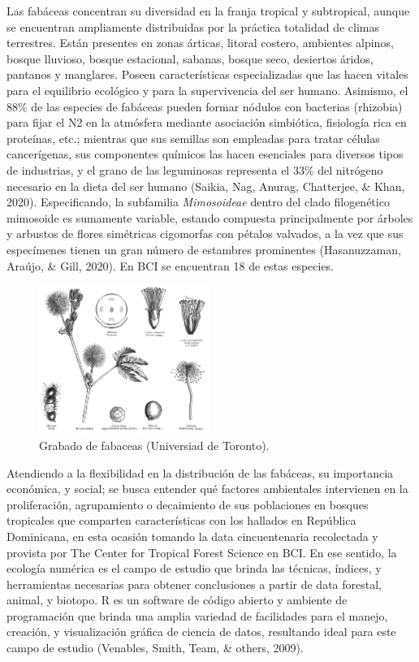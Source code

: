 \documentclass[11pt,]{article}
\begin{document}
Las fabáceas concentran su diversidad en la franja tropical y
subtropical, aunque se encuentran ampliamente distribuidas por la
práctica totalidad de climas terrestres. Están presentes en zonas
árticas, litoral costero, ambientes alpinos, bosque lluvioso, bosque
estacional, sabanas, bosque seco, desiertos áridos, pantanos y
manglares. Poseen características especializadas que las hacen vitales
para el equilibrio ecológico y para la supervivencia del ser humano.
Asimismo, el 88\% de las especies de fabáceas pueden formar nódulos con
bacterias (rhizobia) para fijar el N2 en la atmósfera mediante
asociación simbiótica, fisiología rica en proteínas, etc.; mientras que
sus semillas son empleadas para tratar células cancerígenas, sus
componentes químicos las hacen esenciales para diversos tipos de
industrias, y el grano de las leguminosas representa el 33\% del
nitrógeno necesario en la dieta del ser humano (Saikia, Nag, Anurag,
Chatterjee, \& Khan, 2020). Especificando, la subfamilia
\emph{Mimosoideae} dentro del clado filogenético mimosoide es sumamente
variable, estando compuesta principalmente por árboles y arbustos de
flores simétricas cigomorfas con pétalos valvados, a la vez que sus
especímenes tienen un gran número de estambres prominentes
(Hasanuzzaman, Araújo, \& Gill, 2020). En BCI se encuentran 18 de estas
especies.

\begin{figure}
\centering
\includegraphics[width=0.50000\textwidth]{Grabado-Mimosoideae.png}
\caption{Grabado de fabaceas (Universiad de Toronto). \label{fig:grab}}
\end{figure}

Atendiendo a la flexibilidad en la distribución de las fabáceas, su
importancia económica, y social; se busca entender qué factores
ambientales intervienen en la proliferación, agrupamiento o decaimiento
de sus poblaciones en bosques tropicales que comparten características
con los hallados en República Dominicana, en esta ocasión tomando la
data cincuentenaria recolectada y provista por The Center for Tropical
Forest Science en BCI. En ese sentido, la ecología numérica es el campo
de estudio que brinda las técnicas, índices, y herramientas necesarias
para obtener conclusiones a partir de data forestal, animal, y biotopo.
R es un software de código abierto y ambiente de programación que brinda
una amplia variedad de facilidades para el manejo, creación, y
visualización gráfica de ciencia de datos, resultando ideal para este
campo de estudio (Venables, Smith, Team, \& others, 2009).
\end{document}
